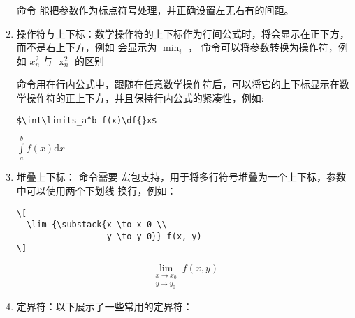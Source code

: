 \begin{enumerate}
命令 \boxforcmd{\\mathpunct{}} 能把参数作为标点符号处理，并正确设置左无右有的间距。

\item 操作符与上下标：数学操作符的上下标作为行间公式时，将会显示在正下方，而不是右上下方，例如  会显示为 $\displaystyle{\min_i}$ ，\boxforcmd{\\mathop{}} 命令可以将参数转换为操作符，例如  $\displaystyle{x_n^2}$ 与  $\displaystyle{\mathop{x}_n^2}$ 的区别

\boxforcmd{\\limits} 命令用在行内公式中，跟随在任意数学操作符后，可以将它的上下标显示在数学操作符的正上下方，并且保持行内公式的紧凑性，例如:

\begin{tcolorbox}[sidebyside]
\begin{lstlisting}
$\int\limits_a^b f(x)\df{}x$
\end{lstlisting} 

\tcblower

${\int\limits_a^b f(x)\mathrm{d}x}$
\end{tcolorbox}

\item 堆叠上下标：\boxforcmd{\\substack{}} 命令需要  宏包支持，用于将多行符号堆叠为一个上下标，参数中可以使用两个下划线 \boxforcmd{\\\\} 换行，例如：

\begin{tcolorbox}[sidebyside]
\begin{lstlisting}
\[ 
  \lim_{\substack{x \to x_0 \\ 
                  y \to y_0}} f(x, y) 
\]
\end{lstlisting} 

\tcblower

\[ 
    \lim_{\substack{x \to x_0 \\ y \to y_0}} f(x, y) 
\]
\end{tcolorbox}

\item 定界符：以下展示了一些常用的定界符：


\end{enumerate}
